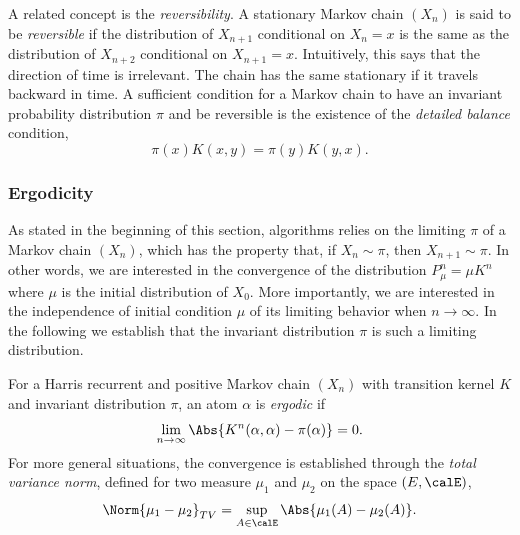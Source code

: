 A related concept is the \emph{reversibility}. A stationary Markov chain
$(X_n)$ is said to be \emph{reversible} if the distribution of $X_{n+1}$
conditional on $X_n = x$ is the same as the distribution of $X_{n+2}$
conditional on $X_{n+1} = x$. Intuitively, this says that the direction of
time is irrelevant. The chain has the same stationary if it travels backward
in time. A sufficient condition for a Markov chain to have an invariant
probability distribution $\pi$ and be reversible is the existence of the
\emph{detailed balance} condition,
\begin{equation}
  \pi(x)K(x,y) = \pi(y)K(y,x).
\end{equation}

\subsubsection{Ergodicity}

As stated in the beginning of this section, \mcmc algorithms relies on the
limiting $\pi$ of a Markov chain $(X_n)$, which has the property that, if
$X_n\sim\pi$, then $X_{n+1}\sim\pi$. In other words, we are interested in the
convergence of the distribution $P_{\mu}^n = \mu K^n$ where $\mu$ is the
initial distribution of $X_0$. More importantly, we are interested in the
independence of initial condition $\mu$ of its limiting behavior when
$n\to\infty$. In the following we establish that the invariant distribution
$\pi$ is such a limiting distribution.

For a Harris recurrent and positive Markov chain $(X_n)$ with transition
kernel $K$ and invariant distribution $\pi$, an atom $\alpha$ is
\emph{ergodic} if
\begin{equation}
  \lim_{n\to\infty}\Abs{K^n(\alpha,\alpha) - \pi(\alpha)} = 0.
\end{equation}
For more general situations, the convergence is established through the
\emph{total variance norm}, defined for two measure $\mu_1$ and $\mu_2$ on the
space $(E,\calE)$,
\begin{equation}
  \Norm{\mu_1-\mu_2}_{TV} = \sup_{A\in\calE}\Abs{\mu_1(A) - \mu_2(A)}.
\end{equation}

